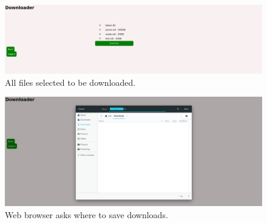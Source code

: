 \documentclass{article}
\begin{document}
    \begin{figure}[h]
    \includegraphics[scale=.25]{p8}
        \caption{All files selected to be downloaded.}
    \end{figure}

    \begin{figure}[h]
    \includegraphics[scale=.25]{p9}
        \caption{Web browser asks where to save downloads.}
    \end{figure}
\end{document}
